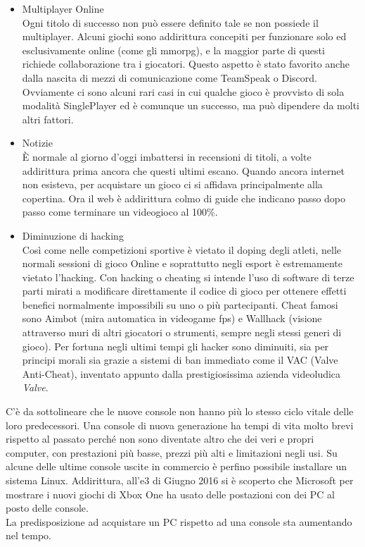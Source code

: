 \begin{itemize}
\item Multiplayer Online \\
Ogni titolo di successo non può essere definito tale se non possiede il multiplayer. Alcuni giochi sono addirittura concepiti per funzionare solo ed esclusivamente online (come gli \gls{mmorpg}), e la maggior parte di questi richiede collaborazione tra i giocatori. Questo aspetto è stato favorito anche dalla nascita di mezzi di comunicazione come TeamSpeak o Discord. Ovviamente ci sono alcuni rari casi in cui qualche gioco è provvisto di sola modalità SinglePlayer ed è comunque un successo, ma può dipendere da molti altri fattori.
\item Notizie \\
È normale al giorno d’oggi imbattersi in recensioni di titoli, a volte addirittura prima ancora che questi ultimi escano. Quando ancora internet non esisteva, per acquistare un gioco ci si affidava principalmente alla copertina. Ora il web è addirittura colmo di guide che indicano passo dopo passo come terminare un videogioco al 100\%.
\item Diminuzione di hacking \\
Così come nelle competizioni sportive è vietato il doping degli atleti, nelle normali sessioni di gioco Online e soprattutto negli \gls{esport} è estremamente vietato l’hacking.
Con hacking o cheating si intende l’uso di software di terze parti mirati a modificare direttamente il codice di gioco per ottenere effetti benefici normalmente impossibili su uno o più partecipanti. Cheat famosi sono Aimbot (mira automatica in videogame \gls{fps}) e Wallhack (visione attraverso muri di altri giocatori o strumenti, sempre negli stessi generi di gioco). Per fortuna negli ultimi tempi gli hacker sono diminuiti, sia per principi morali sia grazie a sistemi di ban immediato come il VAC (Valve Anti-Cheat), inventato appunto dalla prestigiosissima azienda videoludica \textit{Valve}.
\end{itemize}
C’è da sottolineare che le nuove console non hanno più lo stesso ciclo vitale delle loro predecessori. Una console di nuova generazione ha tempi di vita molto brevi rispetto al passato perché non  sono diventate altro che dei veri e propri computer, con prestazioni più basse, prezzi più alti e limitazioni negli usi. Su alcune delle ultime console uscite in commercio è perfino possibile installare un sistema Linux. Addirittura, all’\gls{e3} di Giugno 2016 si è scoperto che Microsoft per mostrare i nuovi giochi di Xbox One ha usato delle postazioni con dei PC al posto delle console.\\La predisposizione ad acquistare un PC rispetto ad una console sta aumentando nel tempo.
